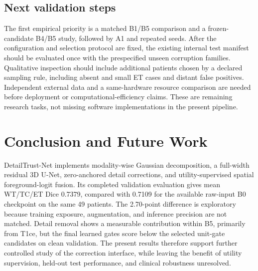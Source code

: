 \documentclass[conference]{IEEEtran}
\begin{document}
\subsection{Next validation steps}
The first empirical priority is a matched B1/B5 comparison and a frozen-candidate B4/B5 study, followed by A1 and repeated seeds. After the configuration and selection protocol are fixed, the existing internal test manifest should be evaluated once with the prespecified unseen corruption families. Qualitative inspection should include additional patients chosen by a declared sampling rule, including absent and small ET cases and distant false positives. Independent external data and a same-hardware resource comparison are needed before deployment or computational-efficiency claims. These are remaining research tasks, not missing software implementations in the present pipeline.

\section{Conclusion and Future Work}
DetailTrust-Net implements modality-wise Gaussian decomposition, a full-width residual 3D U-Net, zero-anchored detail corrections, and utility-supervised spatial foreground-logit fusion. Its completed validation evaluation gives mean WT/TC/ET Dice 0.7379, compared with 0.7109 for the available raw-input B0 checkpoint on the same 49 patients. The 2.70-point difference is exploratory because training exposure, augmentation, and inference precision are not matched. Detail removal shows a measurable contribution within B5, primarily from T1ce, but the final learned gates score below the selected unit-gate candidates on clean validation. The present results therefore support further controlled study of the correction interface, while leaving the benefit of utility supervision, held-out test performance, and clinical robustness unresolved.
\end{document}
